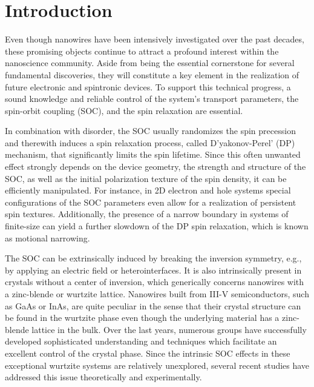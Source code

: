 \documentclass[superscriptaddress,noshowpacs,noshowkeys, twocolumn, floatfix,aps, prb,reprint]{revtex4-1}
\begin{document}
\section{Introduction}

Even though nanowires have been intensively investigated over the past decades, these promising objects continue to attract a profound interest within the nanoscience community. \cite{Yang2010}
Aside from being the essential cornerstone for several fundamental  discoveries,\cite{Mourik2012,Das2012,Hofstetter2009,vanDam2006} they will constitute a key element in the realization of future electronic and spintronic devices.\cite{Heedt2013book,Greytak2005,Xiang2006,Nadj2010,Nadj2012,
 Krogstrup2013,Xing2014,FariaJunior2015,Xing2015}
To support this technical progress, a sound knowledge and reliable control of the system's transport parameters, the spin-orbit coupling (SOC), and the spin relaxation are essential.
%

In combination with disorder, the SOC usually randomizes the spin precession and therewith induces a spin relaxation process, called D'yakonov-Perel' (DP) mechanism, that significantly limits the spin lifetime.\cite{perel} 
Since this often unwanted effect strongly depends on the device geometry, the strength and structure of the SOC, as well as the initial polarization texture of the spin density, it can be efficiently manipulated. 
For instance, in 2D electron and hole systems special configurations of the SOC parameters even allow for a realization of persistent spin textures.\cite{Kammermeier2016PRL,Wenk2016,Schliemann2003,Bernevig2006,Trushin2007,Dollinger2014,Schliemann2016,Kohda2017}
Additionally, the presence of a narrow boundary in systems of finite-size can yield a further slowdown of the DP spin relaxation, which is known as motional narrowing.\cite{Malshukov2000,Kiselev2000,Schwab2006,Kettemann2007a,
Wenk2010,Wenk2011,Kammermeier2017,Schapers2006,Holleitner2007}

The SOC can be extrinsically induced by breaking the inversion symmetry, e.g., by applying an electric field or heterointerfaces. 
It is also intrinsically present in crystals without a center of inversion, which generically concerns nanowires with a zinc-blende or wurtzite lattice.
Nanowires built from III-V semiconductors, such as GaAs or InAs, are quite peculiar in the sense that their crystal structure can be found in the wurtzite phase even though the underlying material has a zinc-blende lattice in the bulk.
Over the last years, numerous groups have successfully developed sophisticated understanding and techniques which facilitate an excellent control of the crystal phase.\cite{Glas2007,Patriarche2008,Zhang2010a,Krogstrup2011,Rieger2013,
Schroth2015,FontcubertaiMorral2016,Jacobsson2016,Zhang2018}
Since the intrinsic SOC effects in these exceptional wurtzite systems are relatively unexplored, several recent studies have addressed this issue  theoretically\cite{De2010,Chei2011,Intronati2013,Gmitra2016,Campos2018,
FariaJunior2016} and experimentally.\cite{Furthmeier2016,Scheruebl2016,Jespersen2018}
\end{document}
